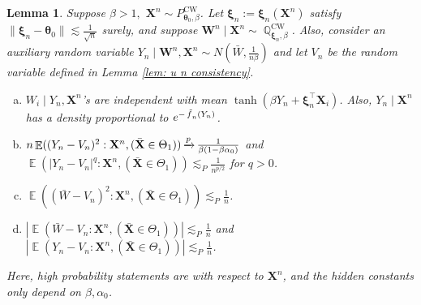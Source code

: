 \documentclass[preprint,reqno]{imsart}
\newtheorem{lemma}[thm]{Lemma}
\newcommand{\ttheta}{\boldsymbol{\theta}}
\DeclareMathOperator{\ft}{\tilde{\mathnormal f}}
\newcommand{\thetahat}{\hat{\ttheta}_{\mathnormal n}}
\DeclareMathOperator{\xp}{\xrightarrow{\mathnormal p}}
\DeclareMathOperator{\EE}{\mathbb{E}}
\DeclareMathOperator{\QQ}{\mathbb{Q}}
\newcommand{\W}{\mathbf{W}}
\newcommand{\X}{\mathbf{X}}
\newcommand{\xxi}{\boldsymbol \xi}
\DeclareMathOperator{\sumin}{\sum_{\mathnormal i=1}^{\mathnormal n}}
\DeclareMathOperator*{\argmin}{arg\,min}
\begin{document}
\begin{appendix}
\begin{lemma}\label{lem:W bar moment bound low tmp}
    Suppose $\beta >1,$ $\X^n \sim P_{\ttheta_0,\beta}^{\text{CW}}$. Let $\xxi_n:= \xxi_n(\X^n)$ satisfy $\|\xxi_n - \ttheta_0\| \lesssim \frac{1}{\sqrt{n}}$ surely, and suppose $\W^n \mid \X^n \sim \QQ_{\xxi_n,\beta}^{\text{CW}}$. Also, consider an auxiliary random variable $Y_n \mid \W^n, \X^n \sim N(\bar{W}, \frac{1}{n \beta})$ and let $V_n$ be the random variable defined in Lemma \ref{lem: u n consistency}. 
    \begin{enumerate}[(a)]
    \item $W_i \mid Y_n, \X^n$'s are independent with mean $\tanh(\beta Y_n + \xxi_n^\top \X_i)$. Also, $Y_n \mid \X^n$ has a density proportional to $e^{-\ft_n(Y_n)}$.
    \item  $n \EE ( (Y_n- V_n)^2 : \X^n, (\bar{\X} \in \Theta_1) ) \xp \frac{1}{\beta(1 - \beta \alpha_0)}$ and $\EE ( |Y_n- V_n|^q : \X^n, (\bar{\X} \in \Theta_1) ) \lesssim_P \frac{1}{n^{p/2}}$ for $q > 0$.
    \item $\EE ( (\bar{W}- V_n)^2 : \X^n, (\bar{\X} \in \Theta_1) ) \lesssim_P \frac{1}{n}$. %
    \item $|\EE \left(\bar{W}- V_n : \X^n, (\bar{\X} \in \Theta_1) \right)| \lesssim_P \frac{1}{n}$ and $|\EE \left(Y_n- V_n : \X^n, (\bar{\X} \in \Theta_1) \right)| \lesssim_P \frac{1}{n}$. %
    \end{enumerate}
    Here, high probability statements are with respect to $\X^n$, and the hidden constants only depend on $\beta,\alpha_0$. 
\end{lemma}





%





%
%
%
%
%
%
%

\end{appendix}
\end{document}
